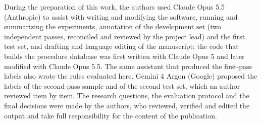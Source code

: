 During the preparation of this work, the authors used Claude Opus 5.5 (Anthropic) to assist with writing and modifying the software,
running and summarizing the experiments, annotation of the development set (two independent passes, reconciled and reviewed by the project lead) and the first test set, and drafting and language
editing of the manuscript; the code that builds the procedure database was first written with Claude Opus 5 and later modified with
Claude Opus 5.5. The same assistant that produced the first-pass labels also wrote the rules evaluated here. Gemini 4 Argon (Google)
proposed the labels of the second-pass sample and of the second test set, which an author reviewed item by item. The research questions,
the evaluation protocol and the final decisions were made by the authors, who reviewed, verified and edited the output and take full
responsibility for the content of the publication.

